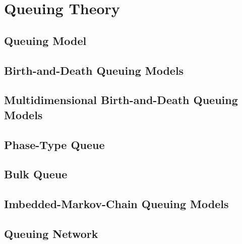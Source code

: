 \part{Queuing Theory}
	\chapter{Queuing Model}

	\chapter{Birth-and-Death Queuing Models}

	\chapter{Multidimensional Birth-and-Death Queuing Models}

	\chapter{Phase-Type Queue}

	\chapter{Bulk Queue}

	\chapter{Imbedded-Markov-Chain Queuing Models}

	\chapter{Queuing Network}